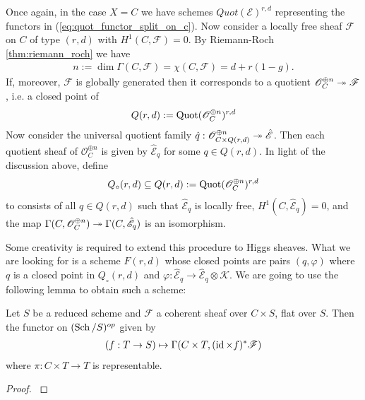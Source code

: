 \documentclass[12pt]{ociamthesis}  %
\begin{document}
\begin{example}\label{ex:quot_scheme_of_lf}
  Once again, in the case $X=C$ we have schemes
  $Quot(\mathscr E)^{r,d}$ representing the functors in
  (\ref{eq:quot_functor_split_on_c}). Now consider a locally free
  sheaf $\mathscr F$ on $C$ of type $(r,d)$ with $H^1(C,\mathscr F)=0$. By Riemann-Roch
  \ref{thm:riemann_roch} we have
  \begin{align*}
    n := \dim\Gamma(C,\mathscr F) = \chi(C,\mathscr F) = d + r(1-g).
  \end{align*}
  If, moreover, $\mathscr F$ is globally generated then it
  corresponds to a quotient $\mathscr O^{\oplus n}_C\twoheadrightarrow \mathscr F$,
  i.e. a closed point of
  \begin{align*}
    Q(r,d) := \operatorname{Quot}(\mathscr O^{\oplus n}_C)^{r,d}
  \end{align*}
  Now consider the universal quotient family
  $\hat q : \mathscr O^{\oplus n}_{C\times Q(r,d)} \twoheadrightarrow \hat{\mathscr E}$.
  Then each quotient sheaf of $\mathscr O_C^{\oplus n}$ is given by
  $\hat{\mathscr E}_q$ for some $q\in Q(r,d)$. In light of the discussion
  above, define
  \begin{align*}
    Q_\circ(r,d) \subseteq Q(r,d) := \operatorname{Quot}(\mathscr O^{\oplus n}_C)^{r,d}
  \end{align*}
  to consists of all $q\in Q(r,d)$ such that $\hat{\mathscr E}_q$ is locally
  free, $H^1(C,\hat{\mathscr E}_q)=0$, and the map
  $\Gamma(C,\mathscr O^{\oplus n}_C)\twoheadrightarrow\Gamma(C,\hat{\mathscr E}_q)$ is
  an isomorphism.
\end{example}

Some creativity is required to extend this procedure to Higgs
sheaves. What we are looking for is a scheme $F(r,d)$ whose closed points
are pairs $(q,\varphi)$ where $q$ is a closed point
in $Q_\circ(r,d)$ and $\varphi : \hat{\mathscr E}_q \to \hat{\mathscr E}_q \otimes \mathscr K$.
We are going to use the following lemma to obtain such a scheme:

\begin{lemma}\label{lem:linear_scheme}
  Let $S$ be a reduced scheme and $\mathscr F$ a coherent sheaf over
  $C\times S$, flat over $S$. Then the functor on $(\operatorname{Sch}/S)^{op}$ given by
  \begin{align*}
    (f : T\to S) \mapsto \Gamma(C\times T,(\operatorname{id}\times f)^*\mathscr F)
  \end{align*}
  where $\pi : C\times T \to T$ is representable.
  \begin{proof}
    \cite[Lemma 3.5]{nitsure1991}
    \missingproof
  \end{proof}
\end{lemma}
\end{document}
